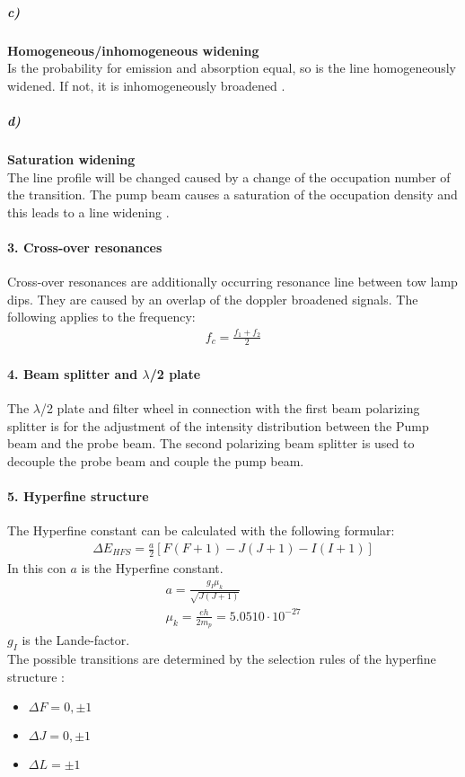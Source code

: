 \subparagraph{c)}\textbf{Homogeneous/inhomogeneous widening}\\
Is the probability for emission and absorption equal, so is the line homogeneously widened. If not, it is inhomogeneously broadened \citep{LSDem}.

\subparagraph{d)}\textbf{Saturation widening}\\
The line profile will be changed caused by a change of the occupation number of the transition. The pump beam causes a saturation of the occupation density and this leads to a line widening \citep{LSDem}.

\paragraph{3. Cross-over resonances}
Cross-over resonances are additionally occurring resonance line between tow lamp dips. They are caused by an overlap of the doppler broadened signals. The following applies to the frequency: 
\begin{gather}
    f_c = \frac{f_1 + f_2}{2}
\end{gather}

\paragraph{4. Beam splitter and $\lambda$/2 plate}
The $\lambda$/2 plate and filter wheel in connection with the first beam polarizing splitter is for the adjustment of the intensity distribution between the Pump beam and the probe beam. The second polarizing beam splitter is used to decouple the probe beam and couple the pump beam.

\paragraph{5. Hyperfine structure}
The Hyperfine constant can be calculated with the following formular: 
\begin{gather}
    \Delta E_{HFS} = \frac{a}{2} [F(F+1) - J(J+1) - I(I+1)]
\end{gather}
In this con $a$ is the Hyperfine constant.
\begin{gather}
    a = \frac{g_I \mu_k}{\sqrt{J(J+1)}} \\
    \mu_k = \frac{eh}{2m_p} = 5.0510 \cdot 10^{-27}
\end{gather}
$g_I$ is the Lande-factor.\\
The possible transitions are determined by the selection rules of the hyperfine structure \citep{Dem}: 
\begin{itemize}
    \item $\Delta F = 0, \pm 1$
    \item $\Delta J = 0, \pm 1$
    \item $\Delta L = \pm 1$
\end{itemize}
